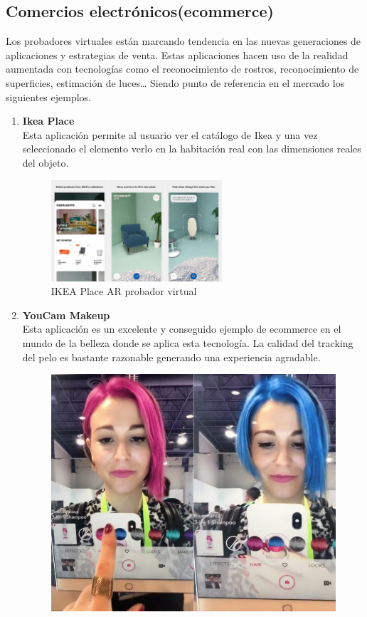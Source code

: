\subsection{Comercios electrónicos(ecommerce)}
Los probadores virtuales están marcando tendencia en las nuevas generaciones de aplicaciones y estrategias de venta. Estas aplicaciones hacen uso de la realidad aumentada con tecnologías como el reconocimiento de rostros, reconocimiento de superficies, estimación de luces… Siendo punto de referencia en el mercado los siguientes ejemplos. 
\begin{enumerate}
\item \textbf{Ikea Place}\\
Esta aplicación permite al usuario ver el catálogo de Ikea y una vez seleccionado el elemento verlo en la habitación real con las dimensiones reales del objeto.
\begin{figure}[H]
     \centering
     \includegraphics[width=0.6\textwidth]{Images/Ikea_App.jpeg}
     \caption{IKEA Place AR probador virtual}
     \label{fig:Ikea}
 \end{figure}
 \item
 \textbf{YouCam Makeup}\\
Esta aplicación es un excelente y conseguido ejemplo de ecommerce en el mundo de la belleza donde se aplica esta tecnología. La calidad del tracking del pelo es bastante razonable generando una experiencia agradable.
\begin{figure}[H]
    \centering
    \includegraphics{Images/Loreal_App.jpeg}

\end{figure}
\end{enumerate}
